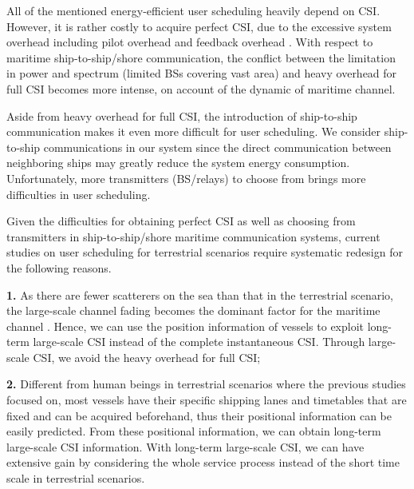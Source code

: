 \documentclass[conference]{IEEEtran}
\begin{document}
All of the mentioned energy-efficient user scheduling heavily depend on CSI. However, it is rather costly to acquire perfect CSI, due to the excessive system overhead including pilot overhead and feedback overhead \cite{p403}. 
With respect to maritime ship-to-ship/shore communication, the conflict between the limitation in power and spectrum (limited BSs covering vast area) and heavy overhead for full CSI becomes more intense, on account of the dynamic of maritime channel.

Aside from heavy overhead for full CSI, the introduction of ship-to-ship communication \cite{p404}\cite{p405}
makes it even more difficult for user scheduling. We consider ship-to-ship communications in our system since the direct communication between neighboring ships may greatly reduce the system energy consumption. Unfortunately, more transmitters (BS/relays) to choose from brings more difficulties in user scheduling. 

Given the difficulties for obtaining perfect CSI as well as choosing from transmitters in ship-to-ship/shore maritime communication systems, current studies on user scheduling for terrestrial scenarios require systematic redesign for the following reasons. 

\textbf{1.} As there are fewer scatterers on the sea than that in the terrestrial scenario, the large-scale channel fading becomes the dominant factor for the maritime channel \cite{p403}. Hence, we can use the position information of vessels to exploit long-term large-scale CSI instead of the complete instantaneous CSI. Through large-scale CSI, we avoid the heavy overhead for full CSI; 

\textbf{2.} Different from human beings in terrestrial scenarios where the previous studies focused on, most vessels have their specific shipping lanes and timetables that are fixed and can be acquired beforehand, thus their positional information can be easily predicted. From these positional information, we can obtain long-term large-scale CSI information. With long-term large-scale CSI, we can have extensive gain by considering the whole service process instead of the short time scale in terrestrial scenarios. 

\end{document}
